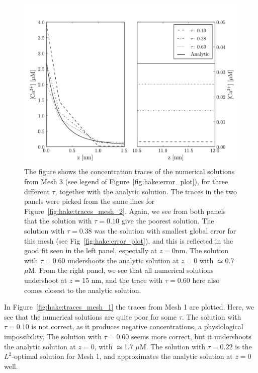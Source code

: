 \begin{figure}
  \label{fig:hake:traces_mesh_3}
  \centering
    \includegraphics[width=\largefig]{chapters/hake/pdf/traces_mesh_3}
    \caption[Concentration traces 3]{The figure shows the
      concentration traces of the numerical solutions from Mesh 3 (see
      legend of Figure~\ref{fig:hake:error_plot}), for three different
      $\tau$, together with the analytic solution. The traces in the
      two panels were picked from the same lines for
      Figure~\ref{fig:hake:traces_mesh_2}. Again, we see from both
      panels that the solution with $\tau=0.10$ give the poorest
      solution. The solution with $\tau=0.38$ was the solution with
      smallest global error for this mesh (see
      Fig~\ref{fig:hake:error_plot}), and this is reflected in the
      good fit seen in the left panel, especially at $z=0$nm. The
      solution with $\tau=0.60$ undershoots the analytic solution at
      $z=0$ with $\simeq$0.7 $\mu$M. From the right panel, we see that
      all numerical solutions undershoot at $z=15$ nm, and the trace
      with $\tau=0.60$ here also comes closest to the analytic
      solution.}
\end{figure}

In Figure~\ref{fig:hake:traces_mesh_1} the traces from Mesh 1 are
plotted. Here, we see that the numerical solutions are quite poor for
some $\tau$. The solution with $\tau=0.10$ is not correct, as it
produces negative concentrations, a physiological impossibility. The
solution with $\tau=0.60$ seems more correct, but it undershoots the
analytic solution at $z=0$, with $\simeq$1.7 $\mu$M. The solution with
$\tau=0.22$ is the $L^2$-optimal solution for Mesh 1, and approximates
the analytic solution at $z=0$ well.

